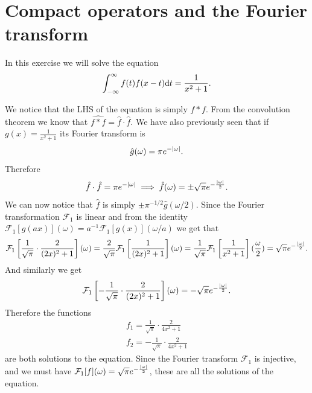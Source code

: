 \documentclass[11pt,a4paper]{article}
\begin{document}
\newpage

\section{Compact operators and the Fourier transform}

\begin{exercise}
  In this exercise we will solve the equation
  \[
    \int_{-\infty}^{\infty} f(t) f(x - t) \mathrm{d} t =
    \frac{1}{x^2 + 1}.
  \]
\end{exercise}
\begin{solution}
  We notice that the LHS of the equation is simply $f * f$.
  From the convolution theorem we know
  that $\widehat{f * f} = \hat{f} \cdot \hat{f}$.
  We have also previously seen that if $g(x) = \frac{1}{x^2 + 1}$
  its Fourier transform is
  \[
    \hat{g}(\omega) = \pi e^{-\left\lvert\omega\right\rvert}.
  \]
  Therefore
  \[
    \hat{f} \cdot \hat{f} = \pi e^{-\left\lvert\omega\right\rvert}
    \implies
    \hat{f}(\omega) = \pm \sqrt{\pi} e^{-\frac{\left\lvert\omega\right\rvert}{2}}.
  \]
  We can now notice that $\hat{f}$ is simply $\pm \pi^{-1/2} \hat{g}(\omega/2)$.
  Since the Fourier transformation $\mathcal F_1$ is linear
  and from the
  identity $\mathcal F_1[g(ax)](\omega) = a^{-1} \mathcal F_1[g(x)](\omega/a)$
  we get that
  \[
    \mathcal F_1 \left[\frac{1}{\sqrt{\pi}} \cdot \frac{2}{(2x)^2 + 1}\right](\omega) =
    \frac{2}{\sqrt{\pi}} \mathcal F_1 \left[\frac{1}{(2x)^2 + 1}\right](\omega) =
    \frac{1}{\sqrt{\pi}} \mathcal F_1 \left[\frac{1}{x^2 + 1}\right](\frac{\omega}{2}) =
    \sqrt{\pi} e^{-\frac{\left\lvert\omega\right\rvert}{2}}.
  \]
  And similarly we get
  \[
    \mathcal F_1 \left[-\frac{1}{\sqrt{\pi}} \cdot \frac{2}{(2x)^2 + 1}\right](\omega) =
    -\sqrt{\pi} e^{-\frac{\left\lvert\omega\right\rvert}{2}}.
  \]
  Therefore the functions
  \begin{gather*}
    f_1 = \frac{1}{\sqrt{\pi}} \cdot \frac{2}{4x^2 + 1} \\
    f_2 = -\frac{1}{\sqrt{\pi}} \cdot \frac{2}{4x^2 + 1}
  \end{gather*}
  are both solutions to the equation.
  Since the Fourier transform $\mathcal F_1$ is injective,
  and we must
  have $\mathcal F_1[f](\omega) = \sqrt{\pi} e^{-\frac{\left\lvert\omega\right\rvert}{2}}$,
  these are all the solutions of the equation.
\end{solution}
\end{document}
